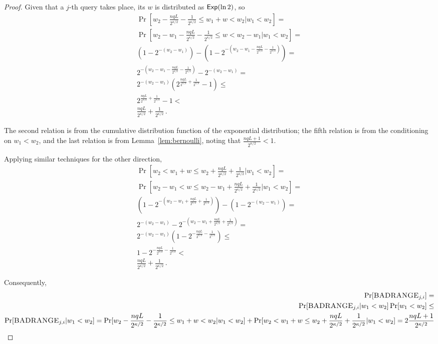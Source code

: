 \begin{proof}
  Given that a $j$-th query takes place, its $w$ is distributed as $\textsf{Exp}(\ln2)$,
  so
  \begin{align*}
    \Pr[w_2 - \frac{nqL}{2^{\kappa/2}} - \frac{1}{2^{\kappa/2}} \leq w_1 + w < w_2 | w_1 < w_2] = \\
    \Pr[w_2 - w_1 - \frac{nqL}{2^{\kappa/2}} - \frac{1}{2^{\kappa/2}} \leq w < w_2 - w_1 | w_1 < w_2] = \\
    (1 - 2^{-(w_2 - w_1)}) - (1 - 2^{-(w_2 - w_1 - \frac{nqL}{2^{\kappa/2}} - \frac{1}{2^{\kappa/2}})}) = \\
    2^{-(w_2 - w_1 - \frac{nqL}{2^{\kappa/2}} - \frac{1}{2^{\kappa/2}})} - 2^{-(w_2 - w_1)} = \\
    2^{-(w_2 - w_1)} (2^{\frac{nqL}{2^{\kappa/2}} + \frac{1}{2^{\kappa/2}}} - 1) \leq \\
    2^{\frac{nqL}{2^{\kappa/2}} + \frac{1}{2^{\kappa/2}}} - 1 < \\
    \frac{nqL}{2^{\kappa/2}} + \frac{1}{2^{\kappa/2}}\,.
  \end{align*}

  The second relation is from the cumulative distribution function of the exponential distribution;
  the fifth relation is from the conditioning on $w_1 < w_2$, and the last relation is from
  Lemma~\ref{lem:bernoulli}, noting that $\frac{nqL + 1}{2^{\kappa/2}} < 1$.

  Applying similar techniques for the other direction,
  \begin{align*}
    \Pr[w_2 < w_1 + w \leq w_2 + \frac{nqL}{2^{\kappa/2}} + \frac{1}{2^{\kappa/2}} | w_1 < w_2] = \\
    \Pr[w_2 - w_1 < w \leq w_2 - w_1 + \frac{nqL}{2^{\kappa/2}} + \frac{1}{2^{\kappa/2}} | w_1 < w_2] = \\
    (1 - 2^{-(w_2 - w_1 + \frac{nqL}{2^{\kappa/2}} + \frac{1}{2^{\kappa/2}})}) - (1 - 2^{-(w_2 - w_1)}) = \\
    2^{-(w_2 - w_1)} - 2^{-(w_2 - w_1 + \frac{nqL}{2^{\kappa/2}} + \frac{1}{2^{\kappa/2}})} = \\
    2^{-(w_2 - w_1)} (1 - 2^{-\frac{nqL}{2^{\kappa/2}} - \frac{1}{2^{\kappa/2}}}) \leq \\
    1 - 2^{-\frac{nqL}{2^{\kappa/2}} - \frac{1}{2^{\kappa/2}}} < \\
    \frac{nqL}{2^{\kappa/2}} + \frac{1}{2^{\kappa/2}}\,.
  \end{align*}

  Consequently,
  \begin{align*}
    \Pr[\textsc{BADRANGE}_{j,i}] =\\
    \Pr[\textsc{BADRANGE}_{j,i}|w_1 < w_2]\Pr[w_1 < w_2] \leq\\
    \Pr[\textsc{BADRANGE}_{j,i}|w_1 < w_2] =
    \Pr[w_2 - \frac{nqL}{2^{\kappa/2}} - \frac{1}{2^{\kappa/2}} \leq w_1 + w < w_2 | w_1 < w_2] +
    \Pr[w_2 < w_1 + w \leq w_2 + \frac{nqL}{2^{\kappa/2}} + \frac{1}{2^{\kappa/2}} | w_1 < w_2] =
    2 \frac{nqL + 1}{2^{\kappa/2}}\\
  \end{align*}


\end{proof}

